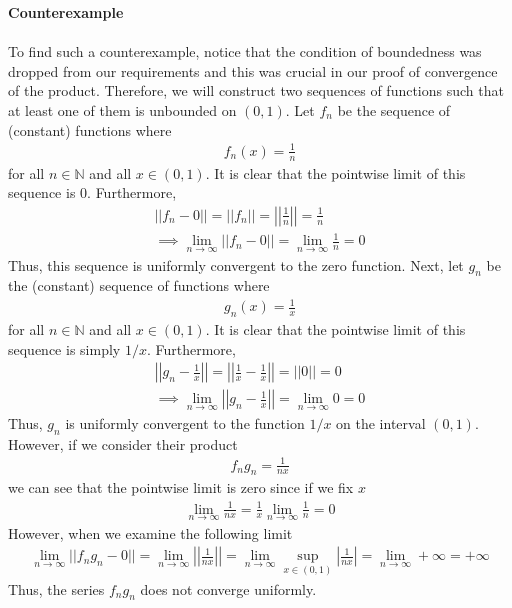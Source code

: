 \documentclass[10pt,a4paper]{article}
\theoremstyle{definition}
\theoremstyle{definition}
\numberwithin{equation}{section}
\begin{document}
$ $
\\\textbf{Counterexample}
\\
\\To find such a counterexample, notice that the condition of boundedness was dropped from our requirements and this was crucial in our proof of convergence of the product. Therefore, we will construct two sequences of functions such that at least one of them is unbounded on $(0, 1)$. Let $f_n$ be the sequence of (constant) functions where 
\begin{align*}
f_n(x) = \frac{1}{n}
\end{align*}
for all $n \in \mathbb{N}$ and all $x \in (0, 1)$. It is clear that the pointwise limit of this sequence is 0. Furthermore, 
\begin{align*}
||f_n - 0|| = ||f_n|| = \left|\left| \frac{1}{n} \right| \right| = \frac{1}{n}\\
\implies \lim_{n \to \infty} ||f_n - 0|| = \lim_{n \to \infty} \frac{1}{n} = 0
\end{align*}
Thus, this sequence is uniformly convergent to the zero function. Next, let $g_n$ be the (constant) sequence of functions where
\begin{align*}
g_n(x) = \frac{1}{x}
\end{align*}
for all $n \in \mathbb{N}$ and all $x \in (0, 1)$. It is clear that the pointwise limit of this sequence is simply $1/x$. Furthermore, 
\begin{align*}
\left|\left|g_n - \frac{1}{x}\right|\right| = \left|\left|\frac{1}{x} - \frac{1}{x}\right|\right| = ||0|| = 0\\
\implies \lim_{n \to \infty} \left|\left|g_n - \frac{1}{x}\right|\right| = \lim_{n \to \infty} 0 = 0
\end{align*}
Thus, $g_n$ is uniformly convergent to the function $1/x$ on the interval $(0, 1)$. However, if we consider their product
\begin{align*}
f_n g_n = \frac{1}{nx}
\end{align*}
we can see that the pointwise limit is zero since if we fix $x$
\begin{align*}
\lim_{n \to \infty} \frac{1}{nx} = \frac{1}{x} \lim_{n \to \infty} \frac{1}{n} = 0
\end{align*}
However, when we examine the following limit
\begin{align*}
\lim_{n \to \infty}||f_n g_n - 0|| = \lim_{n \to \infty} \left|\left| \frac{1}{nx} \right| \right| = \lim_{n \to \infty} \sup_{x \in (0, 1)} \left| \frac{1}{nx} \right| = \lim_{n \to \infty} + \infty = +\infty
\end{align*}
Thus, the series $f_n g_n$ does not converge uniformly. 
\end{document}
